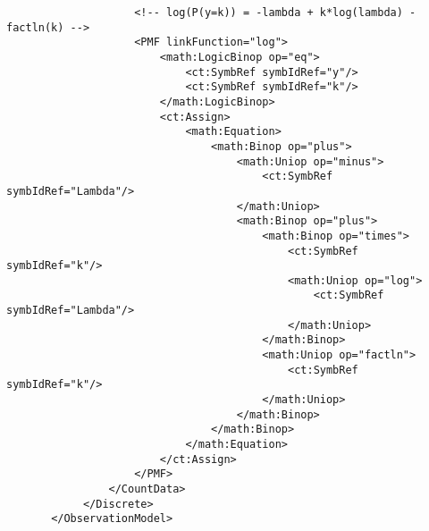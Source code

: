 \begin{lstlisting}
                    <!-- log(P(y=k)) = -lambda + k*log(lambda) - factln(k) -->
                    <PMF linkFunction="log">
                        <math:LogicBinop op="eq">
                            <ct:SymbRef symbIdRef="y"/>
                            <ct:SymbRef symbIdRef="k"/>
                        </math:LogicBinop>
                        <ct:Assign>
                            <math:Equation>
                                <math:Binop op="plus">
                                    <math:Uniop op="minus">
                                        <ct:SymbRef symbIdRef="Lambda"/>
                                    </math:Uniop>
                                    <math:Binop op="plus">
                                        <math:Binop op="times">
                                            <ct:SymbRef symbIdRef="k"/>
                                            <math:Uniop op="log">
                                                <ct:SymbRef symbIdRef="Lambda"/>
                                            </math:Uniop>
                                        </math:Binop>
                                        <math:Uniop op="factln">
                                            <ct:SymbRef symbIdRef="k"/>
                                        </math:Uniop>
                                    </math:Binop>
                                </math:Binop>
                            </math:Equation>
                        </ct:Assign>
                    </PMF>
                </CountData>
            </Discrete>
       </ObservationModel>
\end{lstlisting}

